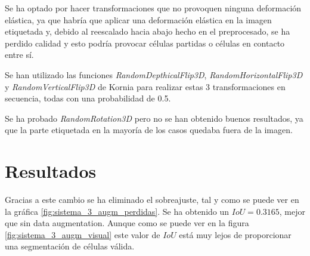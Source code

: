 Se ha optado por hacer transformaciones que no provoquen ninguna deformación elástica, ya que habría que aplicar una deformación elástica en la imagen etiquetada y, debido al reescalado hacia abajo hecho en el preprocesado, se ha perdido calidad y esto podría provocar células partidas o células en contacto entre sí.

Se han utilizado las funciones \textit{RandomDepthicalFlip3D}, \textit{RandomHorizontalFlip3D} y \textit{RandomVerticalFlip3D} de Kornia para realizar estas 3 transformaciones en secuencia, todas con una probabilidad de 0.5.

Se ha probado \textit{RandomRotation3D} pero no se han obtenido buenos resultados, ya que la parte etiquetada en la mayoría de los casos quedaba fuera de la imagen.

\section{Resultados}\label{sec:data_augmentation_resultados}




Gracias a este cambio se ha eliminado el sobreajuste, tal y como se puede ver en la gráfica \ref{fig:sistema_3_augm_perdidas}. Se ha obtenido un $IoU=0.3165$, mejor que sin data augmentation. Aunque como se puede ver en la figura \ref{fig:sistema_3_augm_visual} este valor de $IoU$ está muy lejos de proporcionar una segmentación de células válida.